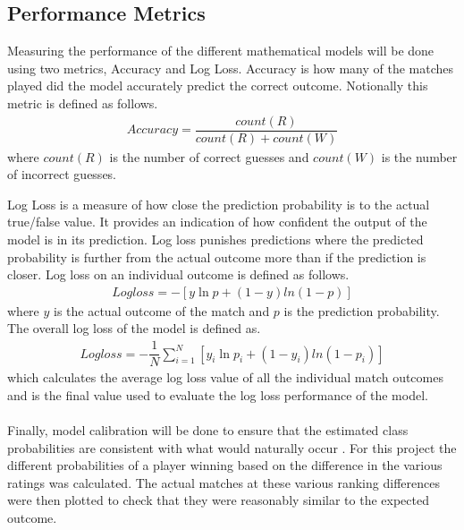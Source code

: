 \documentclass[12pt,a4paper]{article}
\begin{document}
\subsection{Performance Metrics}
Measuring the performance of the different mathematical models will be done using
two metrics, Accuracy and Log Loss. Accuracy is how many of the matches played
did the model accurately predict the correct outcome. Notionally this metric is
defined as follows.
\begin{gather}
  Accuracy = \dfrac{count(R)}{count(R)+count(W)}
\end{gather}
where $count(R)$ is the number of correct guesses and $count(W)$ is the number
of incorrect guesses.

Log Loss is a measure of how close the prediction probability is to the actual
true/false value. It provides an indication of how confident the output of the
model is in its prediction. Log loss punishes predictions where the predicted
probability is further from the actual outcome more than if the prediction is
closer. Log loss on an individual outcome is defined as follows.
\begin{gather}
  Logloss = -[y \ln p +(1-y)ln(1-p)]
\end{gather}
where $y$ is the actual outcome of the match and $p$ is the prediction probability.
The overall log loss of the model is defined as.
\begin{gather}
  Logloss = -\dfrac{1}{N}\sum_{i=1}^{N}[y_i \ln p_i +(1-y_i)ln(1-p_i)]
\end{gather}
which calculates the average log loss value of all the individual match outcomes
and is the final value used to evaluate the log loss performance of the model.
\\
\\
Finally, model calibration will be done to ensure that the estimated class probabilities
are consistent with what would naturally occur \cite{Ruiz_2022}. For this project
the different probabilities of a player winning based on the difference in the various
ratings was calculated. The actual matches at these various ranking differences were
then plotted to check that they were reasonably similar to the expected outcome.
\clearpage
\end{document}
